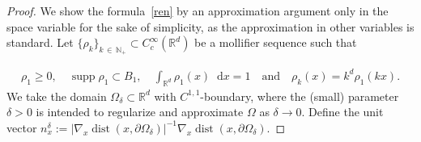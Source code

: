 \documentclass[10pt]{amsart}
\theoremstyle{definition}\newtheorem{defi}[theo]{Definition}\newtheorem{rema}[theo]{Remark}\newtheorem{exam}[theo]{Example}\newtheorem{exem}[theo]{Example}\newtheorem{nota}[theo]{Notation}
\newcommand*{\dif}{\mathop{}\!\mathrm{d}}
\DeclareMathOperator{\supp}{supp}
\DeclareMathOperator{\dist}{dist}
\newcommand*\p{\partial}
\newcommand*\N {\mathbb{N}}
\newcommand*\R {\mathbb{R}}
\begin{document}
\begin{proof}
We show the formula~\eqref{ren} by an approximation argument only in the space variable for the sake of simplicity, as the approximation in other variables is standard. Let $\{\rho_k\}_{k\,\in\,\N_+}\subset C^\infty_c(\R^{d})$ be a mollifier sequence such that

\begin{align*}
\rho_1\ge 0,\quad
\supp\rho_1\subset B_1,\quad
\int_{\R^{d}}\rho_1(x)\dif x=1 \quad \text{and}\quad
\rho_k(x)=k^{d}\rho_1(kx).
\end{align*}
We take the domain $\Omega_\delta\subset\R^{d}$ with $C^{1,1}$-boundary, where the (small) parameter $\delta>0$ is intended to regularize and approximate $\Omega$ as $\delta\rightarrow0$. Define the unit vector $n_x^\delta:=|\nabla_x \dist(x,\p\Omega_\delta)|^{-1}\nabla_x \dist(x,\p\Omega_\delta)$.


\end{proof}
\end{document}
